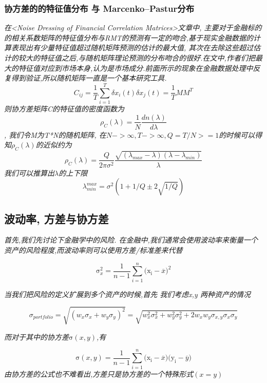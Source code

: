 \documentclass{scrartcl}
\numberwithin{equation}{section}
\begin{document}
\subsubsection{协方差的的特征值分布 与 Marcenko–Pastur分布}
\textsl{在<Noise Dressing of Financial Correlation Matrices>文章中, 主要对于金融标的的相关系数矩阵的特征值分布与RMT的预测有一定的吻合,基于现实金融数据的计算表现出有少量特征值超过随机矩阵预测的估计的最大值, 其次在去除这些超过估计的较大的特征值之后,与随机矩阵理论预测的分布吻合的很好.在文中,作者们把最大的特征值对应到市场本身,认为是市场成分.前面所示的现象在金融数据处理中反复得到验证,所以随机矩阵一直是一个基本研究工具. $$C_{ij} = \frac{1}{T}\sum_{i=1}^T \delta x_i(t) \delta x_j (t) = \frac{1}{T} M M^T$$ 则协方差矩阵C的特征值的密度函数为$$\rho_{C}(\lambda) =  \frac{1}{N} \frac{dn(\lambda)}{d\lambda}$$, 我们令M为T*N的随机矩阵, 在$N -> \infty, T-> \infty, Q= T/N >=1 $的时候可以得知$\rho_{C}(\lambda)$的近似约为$$\rho_{C}(\lambda) = \frac{Q}{2\pi \sigma^2} \frac{\sqrt{(\lambda_{max} - \lambda)(\lambda - \lambda_{min})}}{\lambda}$$我们可以推算出$\lambda$的上下限$$\lambda_{min}^{max} = \sigma^2 (1+ 1/Q \pm 2\sqrt{1/Q})$$}
\subsection{波动率, 方差与协方差}
\indent \textsl{首先,我们先讨论下金融学中的风险. 在金融中,我们通常会使用波动率来衡量一个资产的风险程度,而波动率则可以使用方差/标准差来代替}

\begin{equation}
    \mathrm{\sigma}^2_x=  \frac{1}{n - 1} \sum^n_{i=1} {(\mathrm{x_i}  - \overline{x}})^2
\end{equation}


\indent \textsl{当我们把风险的定义扩展到多个资产的时候,首先 我们考虑x,y 两种资产的情况 }


\begin{equation}
    \sigma_{portfolio}= \sqrt{(w_x\sigma_x + w_y\sigma_y)^2} = \sqrt{w_x^2\sigma_x^2 + w_y^2\sigma_y^2 + 2 w_x w_y\sigma_{x,y} \sigma_x \sigma_y}
\end{equation}


\indent \textsl{而对于其中的协方差$\mathrm{\sigma}(x,y)$,有}

\begin{equation}
    \mathrm{\sigma}(x,y)=  \frac{1}{n - 1} \sum^n_{i=1} {(\mathrm{x_i}  - \overline{x}}) {(\mathrm{y_i}  - \overline{y}})
\end{equation}
\textsl{由协方差的公式也不难看出,方差只是协方差的一个特殊形式$(x=y)$}
\end{document}
